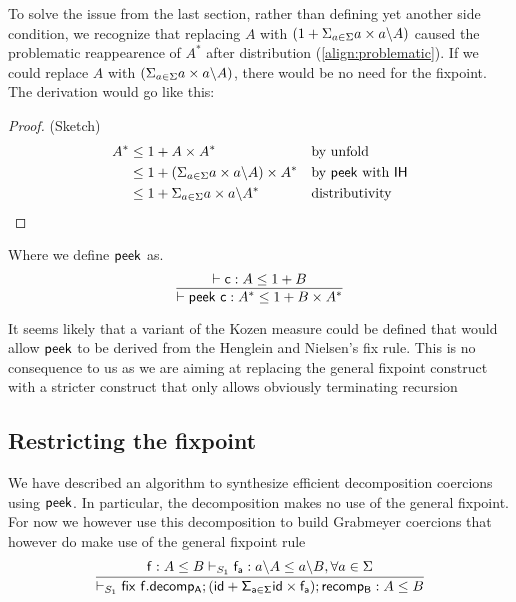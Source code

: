 To solve the issue from the last section, rather than defining yet another side condition, we recognize that replacing $A$ with $(1 + \Sigma_{a \in \Sigma} a\times a \backslash A)$ caused the problematic reappearence of $A^*$ after distribution (\ref{align:problematic}). If we could replace $A$ with $(\Sigma_{a \in \Sigma} a\times a \backslash A)$, there would be no need for the fixpoint. The derivation would go like this:
\begin{proof} (Sketch)
\begin{align}
A^* &\leq  1 + A \times A^* && \text{by unfold}\\
 &\leq 1 + (\Sigma_{a \in \Sigma} a\times a \backslash A) \times A^* && \text{by } \mathsf{peek}~\text{with }\mathsf{IH}\\
 &\leq 1 + \Sigma_{a \in \Sigma} a\times a \backslash A^* && \text{distributivity}
\end{align}
\end{proof}
Where we define $\mathsf{peek}$ as.
\[ \infer{\contains{}{peek ~ c}{A^*}{1 + B \times A^*}}{\contains{}{c}{A}{1 + B}} \]
\begin{remark}
It seems likely that a variant of the Kozen measure could be defined that would allow $\mathsf{peek}$ to be derived from the Henglein and Nielsen's fix rule. This is no consequence to us as we are aiming at replacing the general fixpoint construct with a stricter construct that only allows obviously terminating recursion
\end{remark}

\subsection{Restricting the fixpoint}
We have described an algorithm to synthesize efficient decomposition coercions using $\mathsf{peek}$. In particular, the decomposition makes no use of the general fixpoint. For now we however use this decomposition to build Grabmeyer coercions that however do make use of the general fixpoint rule
\[\infer{\containsP{}{\fix ~f.decomp_A;(id + \Sigma_{a \in \Sigma} id\times f_a); recomp_B}{A}{B}{S_1}}{\containsP{\dslcom{f} : A \leq B}{f_a}{\derive{a}{A}}{\derive{a}{B}}{S_1}, \forall a \in \Sigma} \]



